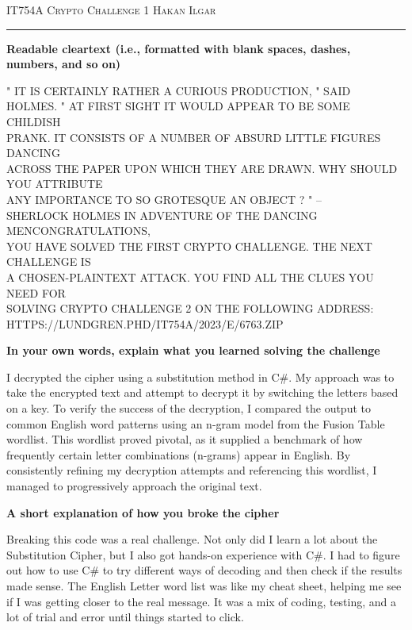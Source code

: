 \documentclass[12pt]{amsart}
\begin{document}
\thispagestyle{empty}

{\scshape IT754A} \hfill {\scshape \large Crypto Challenge 1} \hfill {\scshape Hakan Ilgar}
 
\smallskip

\hrule

\bigskip
\bigskip

{\bf Readable cleartext (i.e., formatted with blank spaces, dashes, numbers, and so on)}
\bigskip

\bigskip
{\small
" IT IS CERTAINLY RATHER A CURIOUS PRODUCTION, " SAID\\
HOLMES. " AT FIRST SIGHT IT WOULD APPEAR TO BE SOME CHILDISH\\
PRANK. IT CONSISTS OF A NUMBER OF ABSURD LITTLE FIGURES DANCING\\
ACROSS THE PAPER UPON WHICH THEY ARE DRAWN. WHY SHOULD YOU ATTRIBUTE\\
ANY IMPORTANCE TO SO GROTESQUE AN OBJECT ? " --\\
SHERLOCK HOLMES IN ADVENTURE OF THE DANCING MENCONGRATULATIONS,\\
YOU HAVE SOLVED THE FIRST CRYPTO CHALLENGE. THE NEXT CHALLENGE IS\\
A CHOSEN-PLAINTEXT ATTACK. YOU FIND ALL THE CLUES YOU NEED FOR\\
SOLVING CRYPTO CHALLENGE 2 ON THE FOLLOWING ADDRESS:\\
HTTPS://LUNDGREN.PHD/IT754A/2023/E/6763.ZIP
} \\

\bigskip


{\bf In your own words, explain what you learned solving the challenge}

\bigskip


I decrypted the cipher using a substitution method in C\#. My approach was to take the encrypted text and attempt to decrypt it by switching the letters based on a key. To verify the success of the decryption, I compared the output to common English word patterns using an n-gram model from the Fusion Table wordlist. This wordlist proved pivotal, as it supplied a benchmark of how frequently certain letter combinations (n-grams) appear in English. By consistently refining my decryption attempts and referencing this wordlist, I managed to progressively approach the original text. \\
\bigskip

{\bf A short explanation of how you broke the cipher}

\bigskip

Breaking this code was a real challenge. Not only did I learn a lot about the Substitution Cipher, but I also got hands-on experience with C\#. I had to figure out how to use C\# to try different ways of decoding and then check if the results made sense. The English Letter word list was like my cheat sheet, helping me see if I was getting closer to the real message. It was a mix of coding, testing, and a lot of trial and error until things started to click. \\
\bigskip
\end{document}
